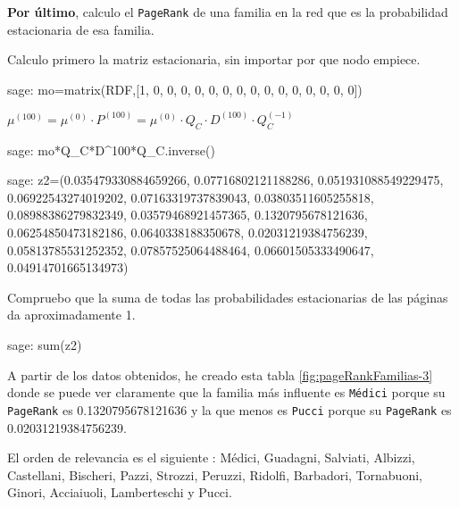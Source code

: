 \par \textbf{Por último}, calculo el \texttt{PageRank} de una familia en la red que es la probabilidad estacionaria de esa familia.
\par Calculo primero la matriz estacionaria, sin importar por que nodo empiece.
\begin{sagecommandline}
    sage: mo=matrix(RDF,[1, 0, 0, 0, 0, 0, 0, 0, 0, 0, 0, 0, 0, 0, 0, 0])
\end{sagecommandline}
\par $\mu^{(100)} = \mu^{(0)} \cdot P^{(100)} = \mu^{(0)} \cdot Q_C \cdot D^{(100)} \cdot Q_C^{(-1)}$
\begin{sagecommandline}
    sage: mo*Q_C*D^100*Q_C.inverse()
\end{sagecommandline}

\begin{sagecommandline}
    sage: z2=(0.035479330884659266, 0.07716802121188286, 0.051931088549229475, 0.06922543274019202, 0.07163319737839043, 0.03803511605255818, 0.08988386279832349, 0.03579468921457365, 0.1320795678121636, 0.06254850473182186, 0.0640338188350678, 0.02031219384756239, 0.05813785531252352, 0.07857525064488464, 0.06601505333490647, 0.04914701665134973)
\end{sagecommandline}

\par Compruebo que la suma de todas las probabilidades estacionarias de las páginas da aproximadamente 1.
\begin{sagecommandline}
    sage: sum(z2)
\end{sagecommandline}

\par A partir de los datos obtenidos, he creado esta tabla \ref{fig:pageRankFamilias-3} donde se puede ver claramente que 
la familia más influente es \texttt{Médici} porque su \texttt{PageRank} es 0.1320795678121636 y la que menos es 
\texttt{Pucci} porque su \texttt{PageRank} es 0.02031219384756239.
\par El orden de relevancia es el siguiente : Médici, Guadagni, Salviati, Albizzi, Castellani, Bischeri, Pazzi, Strozzi, Peruzzi,
Ridolfi, Barbadori, Tornabuoni, Ginori, Acciaiuoli, Lamberteschi y Pucci.


